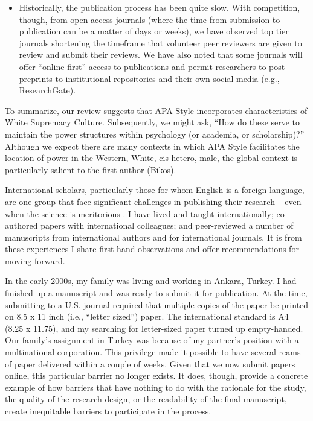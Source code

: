\documentclass[
  11pt,
]{book}
\providecommand{\tightlist}{%
  \setlength{\itemsep}{0pt}\setlength{\parskip}{0pt}}
\begin{document}
\begin{itemize}
\begin{itemize}
    \begin{itemize}
    \tightlist
    \item
      Historically, the publication process has been quite slow. With competition, though, from open access journals (where the time from submission to publication can be a matter of days or weeks), we have observed top tier journals shortening the timeframe that volunteer peer reviewers are given to review and submit their reviews. We have also noted that some journals will offer ``online first'' access to publications and permit researchers to post preprints to institutional repositories and their own social media (e.g., ResearchGate).
    \end{itemize}
  \end{itemize}
\end{itemize}

To summarize, our review suggests that APA Style incorporates characteristics of White Supremacy Culture. Subsequently, we might ask, ``How do these serve to maintain the power structures within psychology (or academia, or scholarship)?'' Although we expect there are many contexts in which APA Style facilitates the location of power in the Western, White, cis-hetero, male, the global context is particularly salient to the first author (Bikos).

International scholars, particularly those for whom English is a foreign language, are one group that face significant challenges in publishing their research -- even when the science is meritorious \citep{gibbons_inaugural_2012}. I have lived and taught internationally; co-authored papers with international colleagues; and peer-reviewed a number of manuscripts from international authors and for international journals. It is from these experiences I share first-hand observations and offer recommendations for moving forward.

In the early 2000s, my family was living and working in Ankara, Turkey. I had finished up a manuscript and was ready to submit it for publication. At the time, submitting to a U.S. journal required that multiple copies of the paper be printed on 8.5 x 11 inch (i.e., ``letter sized'') paper. The international standard is A4 (8.25 x 11.75), and my searching for letter-sized paper turned up empty-handed. Our family's assignment in Turkey was because of my partner's position with a multinational corporation. This privilege made it possible to have several reams of paper delivered within a couple of weeks. Given that we now submit papers online, this particular barrier no longer exists. It does, though, provide a concrete example of how barriers that have nothing to do with the rationale for the study, the quality of the research design, or the readability of the final manuscript, create inequitable barriers to participate in the process.
\end{document}

